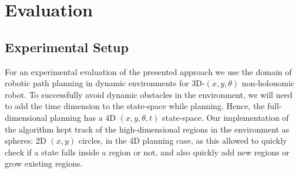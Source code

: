 \fi

\section{Evaluation}
\label{sec:ppad-exp}

\subsection{Experimental Setup}
\label{sec:ppad-experimental-setup}

For an experimental evaluation of the presented approach we use the domain of robotic path planning in dynamic environments for 3D-$(x,y,\theta)$ non-holonomic robot. To successfully avoid dynamic obstacles in the environment, we will need to add the time dimension to the state-space while planning. Hence, the full-dimensional planning has a 4D $(x,y,\theta,t)$ state-space. Our implementation of the algorithm kept track of the high-dimensional regions in the environment as spheres: 2D $(x,y)$ circles, in the 4D planning case, as this allowed to quickly check if a state falls inside a region or not, and also quickly add new regions or grow existing regions. 

